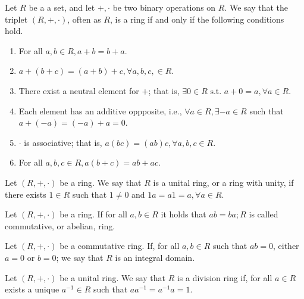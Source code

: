 \documentclass{subfiles}
\begin{document}
    \begin{definition*}[Ring]
        Let \(R\) be a a set, and let \(+, \cdot\) be two binary operations on \(R\).
            We say that the triplet \((R, +, \cdot)\), often as \(R\), is a ring if and only if 
            the following conditions hold.
            \begin{enumerate}
                \item For all \(a, b \in R, a + b = b + a\).
                \item \(a + (b + c) = (a + b) + c, \forall a, b, c, \in R\).
                \item There exist a neutral element for \(+\); that is,
                    \(\exists 0 \in R \text{ s.t. } a + 0 = a, \forall a \in R\).
                \item Each element has an additive oppposite, i.e., \(\forall a \in R,
                    \exists -a \in R\) such that \(a + (-a) = (-a) + a = 0\).
                \item \(\cdot\) is associative; that is, \(a(bc) = (ab)c, \forall a, b, c \in R\).
                \item For all \(a, b, c \in R, a(b + c) = ab + ac\).
            \end{enumerate}
    \end{definition*}

    \begin{definition*}
        Let \((R, +, \cdot)\) be a ring. We say that \(R\) is a unital ring, 
            or a ring with unity, if there exists \(1 \in R\) such that \(1 \ne 0\)
            and \(1a = a1 = a, \forall a \in R\).
    \end{definition*}

    \begin{definition*}
        Let \((R, +, \cdot)\) be a ring. If for all \(a, b \in R\) it holds that 
            \(ab = ba; R\) is called commutative, or abelian, ring. 
    \end{definition*}

    \begin{definition*}
        Let \((R, +, \cdot)\) be a commutative ring. If, for all \(a, b \in R\)
            such that \(ab = 0\), either \(a = 0\) or \(b = 0\); 
            we say that \(R\) is an integral domain.
    \end{definition*}

    \begin{definition*}
        Let \((R, +, \cdot)\) be a unital ring. We say that \(R\) is a division
            ring if, for all \(a \in R\) exists a unique \(a^{-1} \in R\) such that 
            \(aa^{-1} = a^{-1}a = 1\).
    \end{definition*}
\end{document}

